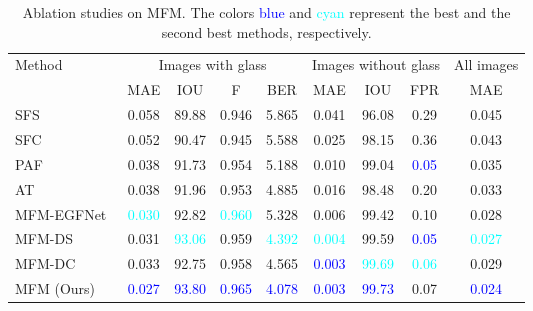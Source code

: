 \begin{table*}[ht]
\renewcommand\arraystretch{1.5}
\setlength\tabcolsep{5pt}
\centering
\caption{Ablation studies on MFM. The colors \textcolor{blue}{blue} and \textcolor{cyan}{cyan} represent the best and the second best methods, respectively.}
\label{tab:ab_mfm}
\begin{tabular}{lcccccccc} 
\toprule
\multirow{2}{*}{Method} & \multicolumn{4}{c}{Images with glass} & \multicolumn{3}{c}{Images without glass} & All images        \\ 
\cmidrule[0.25pt](lr){2-5} \cmidrule[0.25pt](lr){6-8} \cmidrule[0.25pt](lr){9-9} 
& MAE                       & IOU                         & F                     & BER                       & MAE                       & IOU                    & FPR                      & MAE   \\ 
\midrule
SFS & \multicolumn{1}{c}{0.058} & \multicolumn{1}{c}{89.88} & \multicolumn{1}{c}{0.946} & 5.865 & \multicolumn{1}{c}{0.041} & \multicolumn{1}{c}{96.08} & 0.29 & 0.045\\ 
SFC & \multicolumn{1}{c}{0.052} & \multicolumn{1}{c}{90.47} & \multicolumn{1}{c}{0.945} & 5.588 & \multicolumn{1}{c}{0.025} & \multicolumn{1}{c}{98.15} & 0.36 & 0.043\\ 
PAF~\cite{kalra2020deep} & \multicolumn{1}{c}{0.038} & \multicolumn{1}{c}{91.73} & \multicolumn{1}{c}{0.954} & 5.188 & \multicolumn{1}{c}{0.010} & \multicolumn{1}{c}{99.04} & \textcolor{blue}{0.05} & 0.035\\ 
AT~\cite{li2020rgb} & \multicolumn{1}{c}{0.038} & \multicolumn{1}{c}{91.96} & \multicolumn{1}{c}{0.953} & 4.885 & \multicolumn{1}{c}{0.016} & \multicolumn{1}{c}{98.48} & 0.20 & 0.033\\ 
MFM-EGFNet~\cite{zhou2022edge} & \multicolumn{1}{c}{\textcolor{cyan}{0.030}} & \multicolumn{1}{c}{92.82} & \multicolumn{1}{c}{\textcolor{cyan}{0.960}} & 5.328 & \multicolumn{1}{c}{0.006} & \multicolumn{1}{c}{99.42} & 0.10 & 0.028\\
MFM-DS & \multicolumn{1}{c}{0.031} & \multicolumn{1}{c}{\textcolor{cyan}{93.06}} & \multicolumn{1}{c}{0.959} & \textcolor{cyan}{4.392} & \multicolumn{1}{c}{\textcolor{cyan}{0.004}} & \multicolumn{1}{c}{99.59} & \textcolor{blue}{0.05} & \textcolor{cyan}{0.027}\\ 
MFM-DC & \multicolumn{1}{c}{0.033} & \multicolumn{1}{c}{92.75} & \multicolumn{1}{c}{0.958} & 4.565 & \multicolumn{1}{c}{\textcolor{blue}{0.003}} & \multicolumn{1}{c}{\textcolor{cyan}{99.69}} & \textcolor{cyan}{0.06} & 0.029\\ \hline


MFM (Ours) & \multicolumn{1}{c}{\textcolor{blue}{0.027}} & \multicolumn{1}{c}{\textcolor{blue}{93.80}} & \multicolumn{1}{c}{\textcolor{blue}{0.965}} & \textcolor{blue}{4.078} & \multicolumn{1}{c}{\textcolor{blue}{0.003}} & \multicolumn{1}{c}{\textcolor{blue}{99.73}} & 0.07 &\textcolor{blue}{0.024}\\ 
\bottomrule
\end{tabular}
\end{table*}







